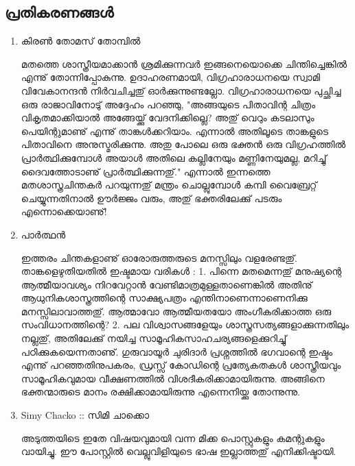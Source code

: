 \subsection*{പ്രതികരണങ്ങള്‍}
\begin{enumerate}
 \item{കിരണ്‍ തോമസ് തോമ്പില്‍}

മതത്തെ ശാസ്ത്രീയമാക്കാന്‍ ശ്രമിക്കുന്നവര്‍ ഇങ്ങനെയൊക്കെ ചിന്തിച്ചെങ്കില്‍ 
എന്നു് തോന്നിപ്പോകുന്നു. ഉദാഹരണമായി, വിഗ്രഹാരാധനയെ സ്വാമി വിവേകാനന്ദന്‍ നിര്‍വചിച്ചതു് ഓര്‍ക്കുന്നുണ്ടല്ലോ. 
വിഗ്രഹാരാധനയെ പുച്ഛിച്ച ഒരു രാജാവിനോടു് അദ്ദേഹം പറഞ്ഞു, "അങ്ങയുടെ പിതാവിന്റ ചിത്രം വികൃതമാക്കിയാല്‍ 
അങ്ങേയ്ക്കു് വേദനിക്കില്ലെ? അതു് വെറും കടലാസും പെയിന്റുമാണു് എന്നു് താങ്കള്‍ക്കറിയാം. എന്നാല്‍ അതിലൂടെ താങ്കളുടെ 
പിതാവിനെ അനുസ്മരിക്കുന്നു. അതു പോലെ ഒരു ഭക്തന്‍ ഒരു വിഗ്രഹത്തില്‍ പ്രാര്‍ത്ഥിക്കുമ്പോള്‍ അയാള്‍ അതിലെ 
കല്ലിനേയും മണ്ണിനേയുമല്ല, മറിച്ചു് ദൈവത്തോടാണു് പ്രാര്‍ത്ഥിക്കുന്നതു്." എന്നാല്‍ ഇന്നത്തെ മതശാസ്ത്രചിന്തകര്‍ പറയുന്നതു് 
മന്ത്രം ചൊല്ലുമ്പോള്‍ കമ്പി വൈബ്രേറ്റ്‌ ചെയ്യുന്നതിനാല്‍ ഊര്‍ജ്ജം വരും, അതു് ഭക്തരിലേക്കു് പടരും എന്നൊക്കെയാണു്!

 \item{പാര്‍ത്ഥന്‍}

ഇത്തരം ചിന്തകളാണു് ഓരോരുത്തരുടെ മനസ്സിലും വളരേണ്ടതു്. താങ്കളെഴുതിയതില്‍ ഇഷ്ടമായ വരികള്‍ : 1. പിന്നെ മതമെന്നതു് മനുഷ്യന്റെ ആത്മീയാവശ്യം നിറവേറ്റാന്‍ വേണ്ടിമാത്രമുള്ളതാണെങ്കില്‍ അതിനു് ആധുനികശാസ്ത്രത്തിന്റെ സാക്ഷ്യപത്രം എന്തിനാണെന്നാണെനിക്കു മനസ്സിലാവാത്തതു്. ആത്മാവോ ആത്മീയതയോ അംഗീകരിക്കാത്ത ഒരു സംവിധാനത്തിന്റെ? 2. പല വിശ്വാസങ്ങളേയും ശാസ്ത്രസത്യങ്ങളാക്കുന്നതിലും നല്ലതു്, അതിലേക്കു് നയിച്ച സാമൂഹികസാഹചര്യങ്ങളെക്കുറിച്ചു് പഠിക്കുകയെന്നതാണു്. ഗുരുവായൂര്‍ ചുരിദാര്‍ പ്രശ്നത്തില്‍ ഭഗവാന്റെ ഇഷ്ടം എന്നു് പറഞ്ഞതിനുപകരം, ഡ്രസ്സ്‌ കോഡിന്റെ പ്രത്യേകതകള്‍ ശാസ്ത്രീയവും സാമൂഹികവുമായ വീക്ഷണത്തില്‍ വിശദീകരിക്കാമായിരുന്നു. അങ്ങിനെ ഭക്തന്മാരുടെ മാനം രക്ഷിക്കാമായിരുന്നു എന്നെനിയ്ക്കു തോന്നുന്നു.
 
  \item{Simy Chacko :: സിമി ചാക്കൊ}

അടുത്തയിടെ ഇതേ വിഷയവുമായി വന്ന മിക്ക പൊസ്റ്റുകളും കമന്റുകളും വായിച്ചു. 
ഈ പോസ്റ്റില്‍ വെല്ലുവിളിയുടെ ഭാഷ ഇല്ലാത്തതു് എനിക്കിഷ്ടായി.
    
\end{enumerate}

\newpage

